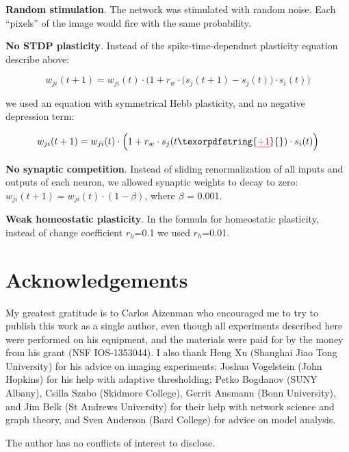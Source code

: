 \documentclass{article}
\providecommand{\DIFaddtex}[1]{{\protect\color{blue}{#1}}} %
\providecommand{\DIFdeltex}[1]{{\protect\color{red}\sout{#1}}}                      %
\providecommand{\DIFaddbegin}{} %
\providecommand{\DIFaddend}{} %
\providecommand{\DIFdelbegin}{} %
\providecommand{\DIFdelend}{} %
\providecommand{\DIFadd}[1]{\texorpdfstring{\DIFaddtex{#1}}{#1}} %
\providecommand{\DIFdel}[1]{\texorpdfstring{\DIFdeltex{#1}}{}} %
\newcommand{\DIFscaledelfig}{0.5}
\newlength{\DIFdelgraphicswidth} %
\newlength{\DIFdelgraphicsheight} %
\newcommand{\DIFaddincludegraphics}[2][]{{\color{blue}\fbox{\DIFOincludegraphics[#1]{#2}}}} %
\newcommand{\DIFdelincludegraphics}[2][]{%
\sbox{\DIFdelgraphicsbox}{\DIFOincludegraphics[#1]{#2}}%
\settoboxwidth{\DIFdelgraphicswidth}{\DIFdelgraphicsbox} %
\settoboxtotalheight{\DIFdelgraphicsheight}{\DIFdelgraphicsbox} %
\scalebox{\DIFscaledelfig}{%
\parbox[b]{\DIFdelgraphicswidth}{\usebox{\DIFdelgraphicsbox}\\[-\baselineskip] \rule{\DIFdelgraphicswidth}{0em}}\llap{\resizebox{\DIFdelgraphicswidth}{\DIFdelgraphicsheight}{%
\setlength{\unitlength}{\DIFdelgraphicswidth}%
\begin{picture}(1,1)%
\thicklines\linethickness{2pt} %
{\color[rgb]{1,0,0}\put(0,0){\framebox(1,1){}}}%
{\color[rgb]{1,0,0}\put(0,0){\line( 1,1){1}}}%
{\color[rgb]{1,0,0}\put(0,1){\line(1,-1){1}}}%
\end{picture}%
}\hspace*{3pt}}} %
} %
\DeclareRobustCommand{\DIFaddbegin}{\DIFOaddbegin \let\includegraphics\DIFaddincludegraphics} %
\DeclareRobustCommand{\DIFaddend}{\DIFOaddend \let\includegraphics\DIFOincludegraphics} %
\DeclareRobustCommand{\DIFdelbegin}{\DIFOdelbegin \let\includegraphics\DIFdelincludegraphics} %
\DeclareRobustCommand{\DIFdelend}{\DIFOaddend \let\includegraphics\DIFOincludegraphics} %
\begin{document}
\textbf{Random stimulation}. The network was stimulated with random noise. Each “pixels” of the image would fire with the same probability.

\textbf{No STDP plasticity}. Instead of the spike-time-dependnet plasticity equation describe above:

\[ w_{ji}(t+1) = w_{ji}(t)\cdot\Big(1+r_w \cdot \big(s_j(t+1)-s_j(t)\big)\cdot s_i(t)\Big) \]

we used an equation with symmetrical Hebb plasticity, and no negative depression term: 

\[ w_{ji}(t+1) = w_{ji}(t)\cdot\Big(1+r_w \cdot s_j(t\DIFdelbegin \DIFdel{+1}\DIFdelend ) \cdot s_i(t)\Big) \]

\textbf{No synaptic competition}. Instead of sliding renormalization of all inputs and outputs of each neuron, we allowed synaptic weights to decay to zero: $w_{ji}(t+1) = w_{ji}(t)\cdot (1-\beta)$, where $\beta$ = 0.001.

\textbf{Weak homeostatic plasticity}. In the formula for homeostatic plasticity, instead of change coefficient $r_h$=0.1 we used $r_h$=0.01.

\section*{Acknowledgements}

My greatest gratitude is to Carlos Aizenman who encouraged me to try to publish this work as a single author, even though all experiments described here were performed on his equipment, and the materials were paid for by the money from his grant (NSF IOS-1353044)\DIFaddbegin \DIFadd{. I am very grateful to Lilach Avitan (The Hebrew University of Jerusalem) and Silas Busch (University of Chicago) for their in-depth reviews of the first version of this manuscript}\DIFaddend . I also thank Heng Xu (Shanghai Jiao Tong University) for his advice on imaging experiments; Joshua Vogelstein (John Hopkins) for his help with adaptive thresholding; Petko Bogdanov (SUNY Albany), Csilla Szabo (Skidmore College), Gerrit Ansmann (Bonn University), and Jim Belk (St Andrews University) for their help with network science and graph theory, and Sven Anderson (Bard College) for advice on model analysis.


The author has no conflicts of interest to disclose.

\nolinenumbers


\end{document}
